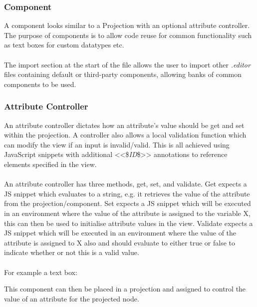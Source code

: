 \documentclass{article}
\begin{document}
{\subsubsection{Component}


A component looks similar to a Projection with an optional attribute controller. The purpose of components is to allow code reuse for common functionality such as text boxes for custom datatypes etc.
\\
\\
The import section at the start of the file allows the user to import other \emph{.editor} files containing default or third-party components, allowing banks of common components to be used.

\subsubsection{Attribute Controller}

An attribute controller dictates how an attribute's value should be get and set within the projection. A controller also allows a local validation function which can modify the view if an input is invalid/valid. This is all achieved using JavaScript snippets with additional <<\$\emph{ID}\$>> annotations to reference elements specified in the view.
\\
\\
An attribute controller has three methods, get, set, and validate. Get expects a JS snippet which evaluates to a string, e.g. it retrieves the value of the attribute from the projection/component. Set expects a JS snippet which will be executed in an environment where the value of the attribute is assigned to the variable X, this can then be used to initialise attribute values in the view. Validate expects a JS snippet which will be executed in an environment where the value of the attribute is assigned to X also and should evaluate to either true or false to indicate whether or not this is a valid value. 
\\
\\
For example a text box: 

This component can then be placed in a projection and assigned to control the value of an attribute for the projected node.

}
\end{document}
